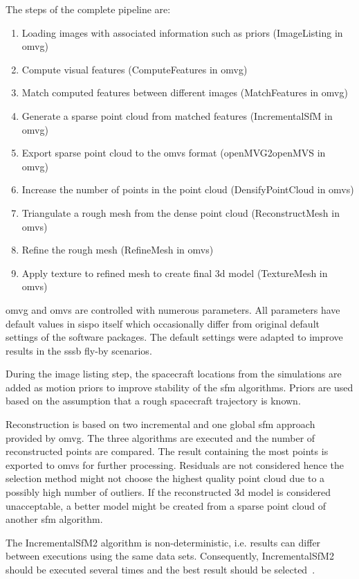 The steps of the complete pipeline are:
\begin{enumerate}
    \item Loading images with associated information such as priors (ImageListing in \gls{omvg})
    \item Compute visual features (ComputeFeatures in \gls{omvg})
    \item Match computed features between different images (MatchFeatures in \gls{omvg})
    \item Generate a sparse point cloud from matched features (IncrementalSfM in \gls{omvg})
    \item Export sparse point cloud to the \gls{omvs} format (openMVG2openMVS in \gls{omvg})
    \item Increase the number of points in the point cloud (DensifyPointCloud in \gls{omvs})
    \item Triangulate a rough mesh from the dense point cloud (ReconstructMesh in \gls{omvs})
    \item Refine the rough mesh (RefineMesh in \gls{omvs})
    \item Apply texture to refined mesh to create final \gls{3d} model (TextureMesh in \gls{omvs})
\end{enumerate}

\gls{omvg} and \gls{omvs} are controlled with numerous parameters. All parameters have default values in \gls{sispo} itself which occasionally differ from  original default settings of the software packages. The default settings were adapted to improve results in the \gls{sssb} fly-by scenarios.

During the image listing step, the spacecraft locations from the simulations are added as motion priors to improve stability of the \gls{sfm} algorithms. Priors are used based on the assumption that a rough spacecraft trajectory is known.

Reconstruction is based on two incremental and one global \gls{sfm} approach provided by \gls{omvg}. The three algorithms are executed and the number of reconstructed points are compared. The result containing the most points is exported to \gls{omvs} for further processing. Residuals are not considered hence the selection method might not choose the highest quality point cloud due to a possibly high number of outliers. If the reconstructed \gls{3d} model is considered unacceptable, a better model might be created from a sparse point cloud of another \gls{sfm} algorithm.

The IncrementalSfM2 algorithm is non-deterministic, i.e. results can differ between executions using the same data sets. Consequently, IncrementalSfM2 should be executed several times and the best result should be selected~\cite{Pajusalu2019CharacterizationMapping}.

